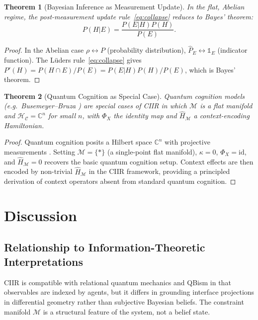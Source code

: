 \documentclass[twocolumn,aps,prd,superscriptaddress,nofootinbib]{revtex4-2}
\newtheorem{theorem}{Theorem}[section]
\newcommand{\HC}{\mathcal{H}_{\mathcal{C}}}
\newcommand{\CM}{\mathcal{M}}
\newcommand{\hatH}{\hat{H}}
\newcommand{\id}{\mathrm{id}}
\begin{document}
\begin{theorem}[Bayesian Inference as Measurement Update]
\label{thm:bayesian}
In the flat, Abelian regime, the post-measurement update rule~\eqref{eq:collapse}
reduces to Bayes' theorem:
\begin{equation}
  P(H|E) = \frac{P(E|H)P(H)}{P(E)}.
  \label{eq:bayes}
\end{equation}
\end{theorem}

\begin{proof}
In the Abelian case $\rho \leftrightarrow P$ (probability distribution), $\hat{P}_E \leftrightarrow \mathbb{1}_E$ (indicator function).  The L{\"u}ders rule~\eqref{eq:collapse} gives $P'(H) = P(H \cap E)/P(E) = P(E|H)P(H)/P(E)$, which is Bayes' theorem.
\end{proof}

\begin{theorem}[Quantum Cognition as Special Case]
\label{thm:qcog}
Quantum cognition models (e.g.\ Busemeyer--Bruza \cite{Busemeyer2012}) are
special cases of CIIR in which $\CM$ is a flat manifold and
$\HC = \mathbb{C}^n$ for small $n$, with $\Phi_X$ the identity map and
$\hatH_\CM$ a context-encoding Hamiltonian.
\end{theorem}

\begin{proof}
Quantum cognition posits a Hilbert space $\mathbb{C}^n$ with projective
measurements \cite{Busemeyer2012}.  Setting $\CM = \{*\}$ (a single-point
flat manifold), $\kappa=0$, $\Phi_X = \id$, and $\hatH_\CM = 0$ recovers
the basic quantum cognition setup.  Context effects are then encoded by
non-trivial $\hatH_\CM$ in the CIIR framework, providing a principled
derivation of context operators absent from standard quantum cognition.
\end{proof}

\section{Discussion}
\label{sec:discussion}

\subsection{Relationship to Information-Theoretic Interpretations}

CIIR is compatible with relational quantum mechanics \cite{Rovelli1996} and
QBism \cite{Fuchs2014} in that observables are indexed by agents, but it
differs in grounding interface projections in differential geometry rather
than subjective Bayesian beliefs.  The constraint manifold $\CM$ is
a structural feature of the system, not a belief state.
\end{document}
